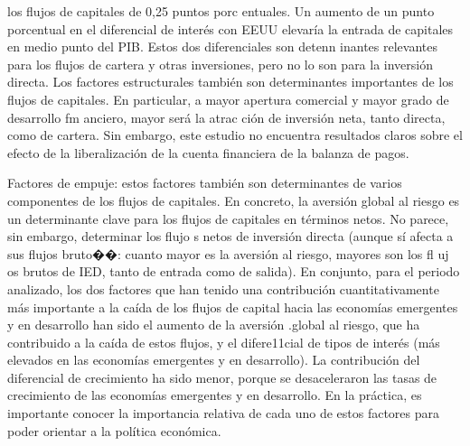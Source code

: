 \documentclass[10pt,a4paper]{article}
\begin{document}
los flujos de capitales de 0,25 puntos porc entuales. Un aumento de un punto porcentual en el diferencial de interés con EEUU elevaría la entrada de capitales en medio punto del PIB. Estos dos diferenciales son detenn inantes relevantes para los flujos de cartera y otras inversiones, pero no lo son para la inversión directa. Los factores estructurales también son determinantes importantes de los flujos de capitales. En particular, a mayor apertura comercial y mayor grado de desarrollo fm anciero, mayor será la atrac ción de inversión neta, tanto directa, como de cartera. Sin embargo, este estudio no encuentra resultados claros sobre el efecto de la liberalización de la cuenta financiera de la balanza de pagos.

Factores de empuje: estos factores también son determinantes de varios componentes de los flujos de capitales. En concreto, la aversión global al riesgo es un determinante clave para los flujos de capitales en términos netos. No parece, sin embargo, determinar los flujo s netos de inversión directa (aunque sí afecta a sus flujos bruto��: cuanto mayor es la aversión al riesgo, mayores son los fl uj os brutos de IED, tanto de entrada como de salida). En conjunto, para el periodo analizado, los dos factores que han tenido una contribución cuantitativamente más importante a la caída de los flujos de capital hacia las economías emergentes y en desarrollo han sido el aumento de la aversión .global al riesgo, que ha contribuido a la caída de estos flujos, y el difere11cial de tipos de interés (más elevados en las economías emergentes y en desarrollo). La contribución del diferencial de crecimiento ha sido menor, porque se desaceleraron las tasas de crecimiento de las economías emergentes y en desarrollo. En la práctica, es importante conocer la importancia relativa de cada uno de estos factores para poder orientar a la política económica. 
\end{document}
